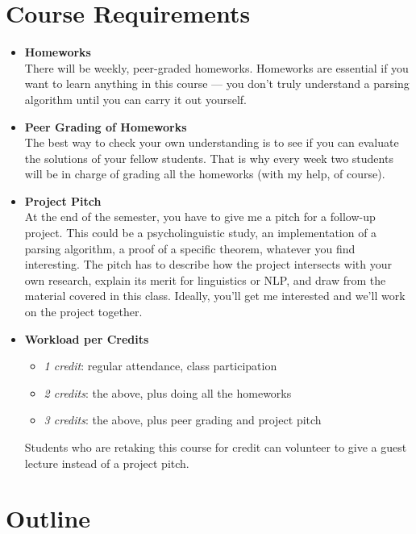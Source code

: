 \section{Course Requirements}
\begin{itemize}
    \item \textbf{Homeworks}\\
        There will be weekly, peer-graded homeworks.
        Homeworks are essential if you want to learn anything in this course --- you don't truly understand a parsing algorithm until you can carry it out yourself.
    \item \textbf{Peer Grading of Homeworks}\\
        The best way to check your own understanding is to see if you can evaluate the solutions of your fellow students.
        That is why every week two students will be in charge of grading all the homeworks (with my help, of course).
    \item \textbf{Project Pitch}\\
        At the end of the semester, you have to give me a pitch for a follow-up project.
        This could be a psycholinguistic study, an implementation of a parsing algorithm, a proof of a specific theorem, whatever you find interesting.
        The pitch has to describe how the project intersects with your own research, explain its merit for linguistics or NLP, and draw from the material covered in this class.
        Ideally, you'll get me interested and we'll work on the project together.
    \item \textbf{Workload per Credits}
        \begin{itemize}
            \item \emph{1 credit}: regular attendance, class participation
            \item \emph{2 credits}: the above, plus doing all the homeworks 
            \item \emph{3 credits}: the above, plus peer grading and project pitch
        \end{itemize}
        Students who are retaking this course for credit can volunteer to give a guest lecture instead of a project pitch.
\end{itemize}


\section{Outline}

